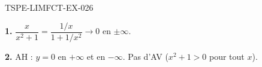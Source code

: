 \begin{corrige}{TSPE-LIMFCT-EX-026}

\textbf{1.} $\dfrac{x}{x^2+1} = \dfrac{1/x}{1+1/x^2} \to \boxed{0}$ en $\pm\infty$.

\textbf{2.} AH : $y = 0$ en $+\infty$ et en $-\infty$. Pas d'AV ($x^2+1 > 0$ pour tout $x$).

\end{corrige}

